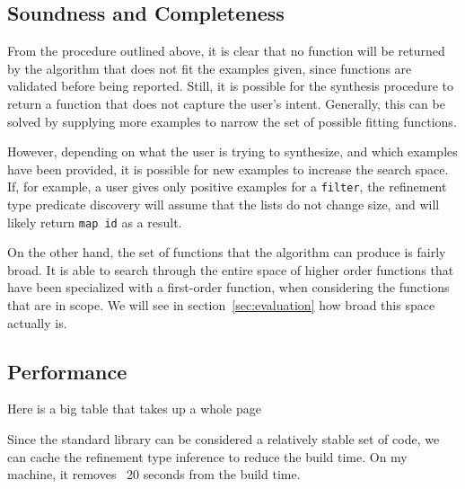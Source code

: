 \subsection{Soundness and Completeness}\label{sound}

From the procedure outlined above, it is clear that no function will be returned by the algorithm that does not fit the examples given, since functions are validated before being reported. Still, it is possible for the synthesis procedure to return a function that does not capture the user's intent. Generally, this can be solved by supplying more examples to narrow the set of possible fitting functions.

However, depending on what the user is trying to synthesize, and which examples have been provided, it is possible for new examples to increase the search space. If, for example, a user gives only positive examples for a \texttt{filter}, the refinement type predicate discovery will assume that the lists do not change size, and will likely return \texttt{map id} as a result.

On the other hand, the set of functions that the algorithm can produce is fairly broad. It is able to search through the entire space of higher order functions that have been specialized with a first-order function, when considering the functions that are in scope. We will see in section~\ref{sec:evaluation} how broad this space actually is.


\subsection{Performance}

Here is a big table that takes up a whole page

Since the standard library can be considered a relatively stable set of code, we can cache the refinement type inference to reduce the build time.
On my machine, it removes ~20 seconds from the build time.